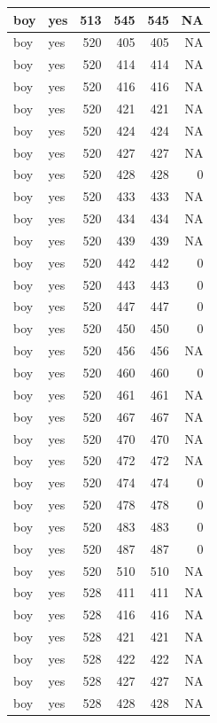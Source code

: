 \documentclass[man]{apa6}
\begin{document}
\begin{tabular}{l|l|r|r|r|r}
\hline
boy & yes & 513 & 545 & 545 & NA\\
\hline
boy & yes & 520 & 405 & 405 & NA\\
\hline
boy & yes & 520 & 414 & 414 & NA\\
\hline
boy & yes & 520 & 416 & 416 & NA\\
\hline
boy & yes & 520 & 421 & 421 & NA\\
\hline
boy & yes & 520 & 424 & 424 & NA\\
\hline
boy & yes & 520 & 427 & 427 & NA\\
\hline
boy & yes & 520 & 428 & 428 & 0\\
\hline
boy & yes & 520 & 433 & 433 & NA\\
\hline
boy & yes & 520 & 434 & 434 & NA\\
\hline
boy & yes & 520 & 439 & 439 & NA\\
\hline
boy & yes & 520 & 442 & 442 & 0\\
\hline
boy & yes & 520 & 443 & 443 & 0\\
\hline
boy & yes & 520 & 447 & 447 & 0\\
\hline
boy & yes & 520 & 450 & 450 & 0\\
\hline
boy & yes & 520 & 456 & 456 & NA\\
\hline
boy & yes & 520 & 460 & 460 & 0\\
\hline
boy & yes & 520 & 461 & 461 & NA\\
\hline
boy & yes & 520 & 467 & 467 & NA\\
\hline
boy & yes & 520 & 470 & 470 & NA\\
\hline
boy & yes & 520 & 472 & 472 & NA\\
\hline
boy & yes & 520 & 474 & 474 & 0\\
\hline
boy & yes & 520 & 478 & 478 & 0\\
\hline
boy & yes & 520 & 483 & 483 & 0\\
\hline
boy & yes & 520 & 487 & 487 & 0\\
\hline
boy & yes & 520 & 510 & 510 & NA\\
\hline
boy & yes & 528 & 411 & 411 & NA\\
\hline
boy & yes & 528 & 416 & 416 & NA\\
\hline
boy & yes & 528 & 421 & 421 & NA\\
\hline
boy & yes & 528 & 422 & 422 & NA\\
\hline
boy & yes & 528 & 427 & 427 & NA\\
\hline
boy & yes & 528 & 428 & 428 & NA\\

\end{tabular}
\end{document}
